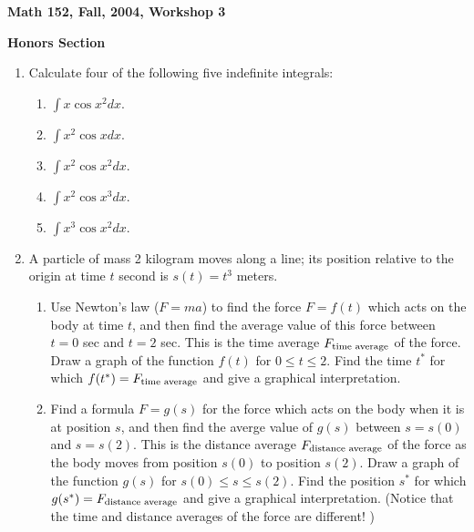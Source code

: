\documentclass[12pt]{article}
\begin{document}
\begin{center}

{\large \bf Math 152, Fall, 2004, Workshop 3\par}
\vspace{.5cm}
{{\bf Honors Section} 
\par}
\end{center}


\begin{enumerate}


\item Calculate four of the following five indefinite integrals:

\begin{enumerate}

\item ${\displaystyle \int x\cos x^{2} dx}$.

\item  ${\displaystyle \int x^{2}\cos x dx}$.

\item ${\displaystyle \int x^{2}\cos x^{2} dx}$.

\item ${\displaystyle \int x^{2}\cos x^{3} dx}$.

\item ${\displaystyle \int x^{3}\cos x^{2} dx}$.

\end{enumerate}


\item A particle of mass 2 kilogram moves along a line; 
its position relative to the origin at time $t$ second 
is $s(t) = t^{3}$ meters. 

\begin{enumerate}

\item Use Newton's law ($F = ma$) to find the force 
$F = f(t)$ which acts on the body at time $t$, and 
then  find the average value of this force between 
$t = 0$ sec and $t = 2$ sec. This is the time average 
$F_{\mbox{\rm \scriptsize time average}}$ of the force. Draw a graph 
of the function $f(t)$ for $0\le t\le 2$. Find the time $t^{*}$ for 
which $f(t^{*}) = F_{\mbox{\rm \scriptsize time average}}$ 
and give a graphical interpretation. 

\item Find a formula $F = g(s)$ for the force which acts on 
the body when it is at position $s$, and 
then find the averge value of $g(s)$ between $s = s(0)$ and 
$s = s(2)$. This is the distance average 
$F_{\mbox{\rm \scriptsize distance average}}$ of the force 
as the body moves from position $s(0)$ to position $s(2)$. Draw a graph 
of the function $g(s)$ for $s(0)\le  s\le s(2)$. Find the 
position $s^{*}$ for which $g(s^{*}) = F_{\mbox{\rm 
\scriptsize distance average}}$ 
and
give a graphical interpretation. 
(Notice that the time and distance averages of the force are different! )


\end{enumerate}
\end{enumerate}
\end{document}
